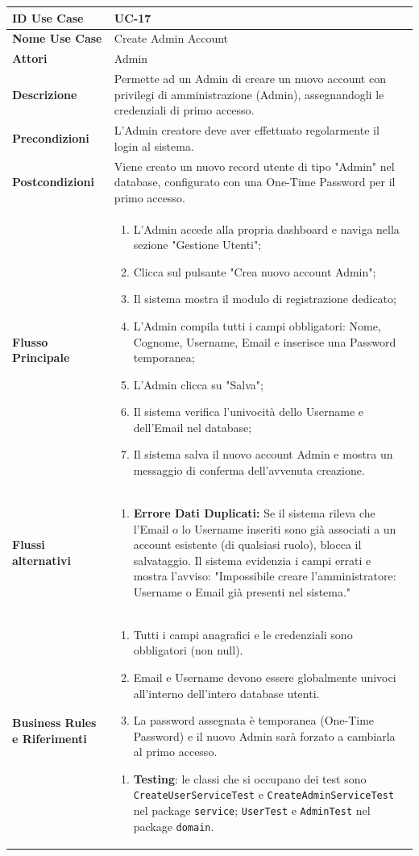 \documentclass{article}
\newcommand{\usecasetable}[9]{
	\begin{table}[h!]
		\centering
		\footnotesize
		\renewcommand{\arraystretch}{1.4}
		\begin{tabularx}{\textwidth}{|l|>{\raggedright\arraybackslash}X|}
			\hline
			\textbf{ID Use Case} & #1 \\ \hline
			\textbf{Nome Use Case} & #2 \\ \hline
			\textbf{Attori} & #3 \\ \hline
			\textbf{Descrizione} & #4 \\ \hline
			\textbf{Precondizioni} & #5 \\ \hline
			\textbf{Postcondizioni} & #6 \\ \hline
			\textbf{Flusso Principale} & #7 \\ \hline
			\textbf{Flussi alternativi} & #8 \\ \hline
			\textbf{Business Rules e Riferimenti} & #9 \\ \hline
		\end{tabularx}
	\end{table}
}
\begin{document}
	\newpage
	
	\usecasetable
	{UC-17}
	{Create Admin Account}
	{Admin}
	{Permette ad un Admin di creare un nuovo account con privilegi di amministrazione (Admin), assegnandogli le credenziali di primo accesso.}
	{L'Admin creatore deve aver effettuato regolarmente il login al sistema.}
	{Viene creato un nuovo record utente di tipo "Admin" nel database, configurato con una One-Time Password per il primo accesso.}
	{
		\begin{enumerate}[nosep, leftmargin=*]
			\item L'Admin accede alla propria dashboard e naviga nella sezione "Gestione Utenti";
			\item Clicca sul pulsante "Crea nuovo account Admin";
			\item Il sistema mostra il modulo di registrazione dedicato;
			\item L'Admin compila tutti i campi obbligatori: Nome, Cognome, Username, Email e inserisce una Password temporanea;
			\item L'Admin clicca su "Salva";
			\item Il sistema verifica l'univocità dello Username e dell'Email nel database;
			\item Il sistema salva il nuovo account Admin e mostra un messaggio di conferma dell'avvenuta creazione.
		\end{enumerate}
	}
	{
		\begin{enumerate}[nosep, leftmargin=25px]
			\item[\textbf{6a-e.}] \textbf{Errore Dati Duplicati:} Se il sistema rileva che l'Email o lo Username inseriti sono già associati a un account esistente (di qualsiasi ruolo), blocca il salvataggio. Il sistema evidenzia i campi errati e mostra l'avviso: "Impossibile creare l'amministratore: Username o Email già presenti nel sistema."
		\end{enumerate}
	}
	{
		\begin{enumerate}[nosep, leftmargin=*]
			\item[•] Tutti i campi anagrafici e le credenziali sono obbligatori (non null).
			\item[•] Email e Username devono essere globalmente univoci all'interno dell'intero database utenti.
			\item[•] La password assegnata è temporanea (One-Time Password) e il nuovo Admin sarà forzato a cambiarla al primo accesso.
		\end{enumerate}
		
		\begin{enumerate}[leftmargin=*]
			\item[•] \textbf{Testing}: le classi che si occupano dei test sono \texttt{CreateUserServiceTest} e \texttt{CreateAdminServiceTest} nel package \texttt{service}; \texttt{UserTest} e \texttt{AdminTest} nel package \texttt{domain}.
		\end{enumerate}
	}
		
\end{document}
